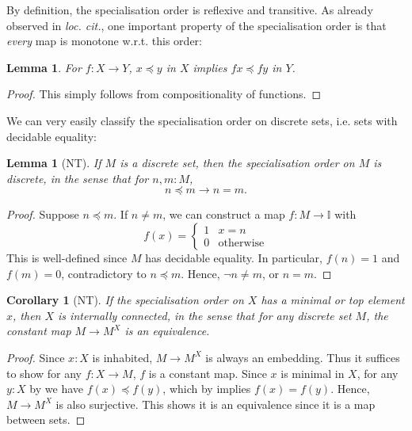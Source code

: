 \documentclass[12pt]{amsart}
\newtheorem{lemma}[theorem]{Lemma}
\newtheorem{corollary}[theorem]{Corollary}
\theoremstyle{definition}
\newcommand{\mbb}[1]{\mathbb{#1}}
\newcommand{\I}{\mbb I}
\newcommand{\other}{\mathrm{otherwise}}
\begin{document}
By definition, the specialisation order is reflexive and transitive. As already observed in \emph{loc. cit.}, one important property of the specialisation order is that \emph{every} map is monotone w.r.t. this order:

\begin{lemma}\label{lem:anymapmonotoneintriscorder}
  For $f : X \to Y$, $x \preceq y$ in $X$ implies $fx \preceq fy$ in $Y$.
\end{lemma}
\begin{proof}
  This simply follows from compositionality of functions.
\end{proof}

We can very easily classify the specialisation order on discrete sets, i.e. sets with decidable equality:

\begin{lemma}[NT]\label{lem:discretephoa}
  If $M$ is a discrete set, then the specialisation order on $M$ is discrete, in the sense that for $n,m : M$,
  \[ n \preceq m \to n = m. \]
\end{lemma}
\begin{proof}
  Suppose $n \preceq m$. If $n \neq m$, we can construct a map $f : M \to \I$ with 
  \[ f(x) =
  \begin{cases}
    1 & x = n \\ 
    0 & \other
  \end{cases}
  \]
  This is well-defined since $M$ has decidable equality. In particular, $f(n) = 1$ and $f(m) = 0$, contradictory to $n \preceq m$. Hence, $\neg n \neq m$, or $n = m$.
\end{proof}

\begin{corollary}[NT]\label{cor:connectedpreservediscrete}
  If the specialisation order on $X$ has a minimal or top element $x$, then $X$ is internally connected, in the sense that for any discrete set $M$, the constant map $M \to M^X$ is an equivalence.
\end{corollary}
\begin{proof}
  Since $x:X$ is inhabited, $M \to M^X$ is always an embedding. Thus it suffices to show for any $f : X \to M$, $f$ is a constant map. Since $x$ is minimal in $X$, for any $y:X$ by  we have $f(x) \preceq f(y)$, which by  implies $f(x) = f(y)$. Hence, $M \to M^X$ is also surjective. This shows it is an equivalence since it is a map between sets.
\end{proof}
\end{document}

